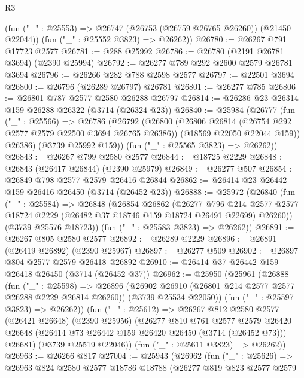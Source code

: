 \begin{lexlean}{R3}
\begin{coremodule}
      (fun ("_" : @25553) => @26747 (@26753 (@26759 @26765 @26260)) (@21450 @22044))
      (fun ("_" : @25552 @3823) => @26262))
@26780 := @26267 @791 @17723 @2577
@26781 := @288 @25992
@26786 := @26780 (@2191 @26781 @3694) (@2390 @25994)
@26792 := @26277 @789 @292 @2600 @2579 @26781 @3694
@26796 := @26266 @282 @788 @2598 @2577
@26797 := @22501 @3694
@26800 := @26796 (@26289 @26797) @26781
@26801 := @26277 @785
@26806 := @26801 @787 @2577 @2580 @26288 @26797
@26814 := @26286 @23 @26314 @159 @26288 @26322 (@3714 (@26324 @23))
@26840 := @25984
    (@26777
      (fun ("_" : @25566) =>
      @26786
        (@26792
          (@26800
            (@26806 @26814 (@26754 @292 @2577 @2579 @22500 @3694 @26765 @26386))
            (@18569 @22050 @22044 @159))
          @26386)
        (@3739 @25992 @159))
      (fun ("_" : @25565 @3823) => @26262))
@26843 := @26267 @799 @2580 @2577
@26844 := @18725 @2229
@26848 := @26843 (@26417 @26844) (@2390 @25979)
@26849 := @26277 @507
@26854 := @26849 @798 @2577 @2579 @26416 @26844
@26862 := @26414 @23 @26442 @159 @26416 @26450 (@3714 (@26452 @23))
@26888 := @25972
    (@26840
      (fun ("_" : @25584) =>
      @26848
        (@26854
          @26862
          (@26277
            @796
            @214
            @2577
            @2577
            @18724
            @2229
            (@26482 @37 @18746 @159 @18724 @26491 @22699)
            @26260))
        (@3739 @25576 @18723))
      (fun ("_" : @25583 @3823) => @26262))
@26891 := @26267 @805 @2580 @2577
@26892 := @26289 @2229
@26896 := @26891 (@26419 @26892) (@2390 @25967)
@26897 := @26277 @509
@26902 := @26897 @804 @2577 @2579 @26418 @26892
@26910 := @26414 @37 @26442 @159 @26418 @26450 (@3714 (@26452 @37))
@26962 := @25950
    (@25961
      (@26888
        (fun ("_" : @25598) =>
        @26896
          (@26902 @26910 (@26801 @214 @2577 @2577 @26288 @2229 @26814 @26260))
          (@3739 @25534 @22050))
        (fun ("_" : @25597 @3823) => @26262))
      (fun ("_" : @25612) =>
      @26267
        @812
        @2580
        @2577
        (@26421 @26648)
        (@2390 @25956)
        (@26277
          @810
          @761
          @2577
          @2579
          @26420
          @26648
          (@26414 @73 @26442 @159 @26420 @26450 (@3714 (@26452 @73)))
          @26681)
        (@3739 @25519 @22046))
      (fun ("_" : @25611 @3823) => @26262))
@26963 := @26266 @817
@27004 := @25943
    (@26962
      (fun ("_" : @25626) =>
      @26963
        @824
        @2580
        @2577
        @18786
        @18788
        (@26277
          @819
          @823
          @2577
          @2579

\end{coremodule}
\end{lexlean}
